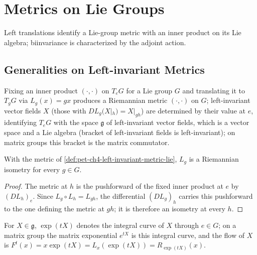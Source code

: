 \section{Metrics on Lie Groups}

Left translations identify a Lie-group metric with an inner product on its Lie
algebra; biinvariance is characterized by the adjoint action.

\subsection{Generalities on Left-invariant Metrics}

\begin{definition}
  \label{def:pet-ch4-left-invariant-metric-lie}
  \leanok
  Fixing an inner product $(\cdot,\cdot)$ on $T_eG$ for a Lie group $G$ and
  translating it to $T_gG$ via $L_g(x)=gx$ produces a Riemannian metric $(\cdot,\cdot)$
  on $G$; left-invariant vector fields $X$ (those with $DL_g(X|_h)=X|_{gh}$)
  are determined by their value at $e$, identifying $T_eG$ with the space
  $\mathfrak g$ of left-invariant vector fields, which is a vector space and a
  Lie algebra (bracket of left-invariant fields is left-invariant); on matrix
  groups this bracket is the matrix commutator.
\end{definition}

\begin{proposition}
  \label{prop:pet-ch4-left-translation-isometry}
  \leanok
  With the metric of \cref{def:pet-ch4-left-invariant-metric-lie}, $L_g$ is a
  Riemannian isometry for every $g\in G$.
\end{proposition}
\begin{proof}
  \leanok
  \sketch
  The metric at $h$ is the pushforward of the fixed inner product at $e$ by
  $(DL_h)_e$. Since $L_g\circ L_h=L_{gh}$, the differential $(DL_g)_h$ carries
  this pushforward to the one defining the metric at $gh$; it is therefore an
  isometry at every $h$.
\end{proof}

\begin{definition}
  \label{def:pet-ch4-lie-algebra-exp}
  \leanok
  For $X\in\mathfrak g$, $\exp(tX)$ denotes the integral curve of $X$ through
  $e\in G$; on a matrix group the matrix exponential $e^{tX}$ is this integral
  curve, and the flow of $X$ is $F^t(x)=x\exp(tX)=L_x(\exp(tX))=R_{\exp(tX)}(x)$.
\end{definition}

